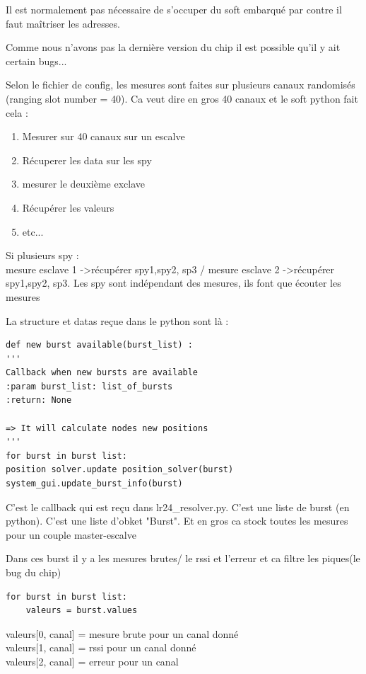 Il est normalement pas nécessaire de s'occuper du soft embarqué par contre il faut maîtriser les adresses.

Comme nous n'avons pas la dernière version du chip il est possible qu'il y ait certain bugs...

Selon le fichier de config, les mesures sont faites sur plusieurs canaux randomisés (ranging slot number = 40). Ca veut dire en gros 40 canaux et le soft python fait cela : 

\begin{enumerate}
	\item Mesurer sur 40 canaux sur un escalve
	\item Récuperer les data sur les spy
	\item mesurer le deuxième exclave
	\item Récupérer les valeurs
	\item etc...
\end{enumerate}

Si plusieurs spy : \\
mesure esclave 1 ->récupérer  spy1,spy2, sp3 / mesure esclave 2 ->récupérer  spy1,spy2, sp3. Les spy sont indépendant des mesures, ils font que écouter les mesures

La structure et datas reçue dans le python sont là :

\begin{lstlisting}
def new burst available(burst_list) :
'''
Callback when new bursts are available
:param burst_list: list_of_bursts
:return: None

=> It will calculate nodes new positions
'''
for burst in burst list:
position solver.update position_solver(burst)
system_gui.update_burst_info(burst)
\end{lstlisting}

C'est le callback qui est reçu dans lr24\_resolver.py. C'est une liste de burst (en python). C'est une liste d'obket "Burst". Et en gros ca stock toutes les mesures pour un couple master-escalve

Dans ces burst il y a les mesures brutes/ le rssi et l'erreur et ca filtre les piques(le bug du chip)
 
\begin{lstlisting}
for burst in burst list:
	valeurs = burst.values
\end{lstlisting}

valeurs[0, canal] = mesure brute pour un canal donné\\
valeurs[1, canal] = rssi pour un canal donné\\
valeurs[2, canal] = erreur pour un canal\\

